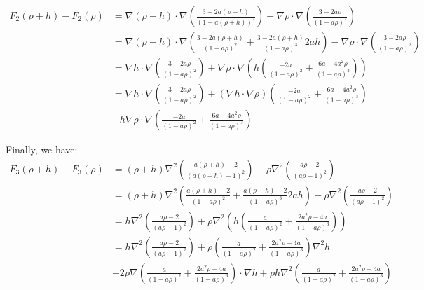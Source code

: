 \documentclass[11pt, a4paper]{article}
\theoremstyle{definition}
\begin{document}
\begin{align*}
	F_2(\rho+h) - F_2(\rho) &= \nabla (\rho +h) \cdot \nabla \left(\frac{3-2a(\rho +h)}{(1-a(\rho+h))^2}\right) -\nabla \rho \cdot \nabla \left(\frac{3-2a\rho}{(1-a\rho)^2}\right) \\
	&= \nabla (\rho +h) \cdot \nabla \left(\frac{3-2a(\rho +h)}{(1-a\rho)^2} + \frac{3-2a(\rho +h)}{(1-a\rho)^3} 2ah \right) -\nabla \rho \cdot \nabla \left(\frac{3-2a\rho}{(1-a\rho)^2}\right)\\
	&=\nabla h \cdot \nabla \left(\frac{3-2a\rho}{(1-a\rho)^2} \right) + \nabla \rho \cdot \nabla \left(h\left(\frac{-2a }{(1-a\rho)^2} + \frac{6a-4a^2  \rho}{(1-a\rho)^3}  \right)\right)\\
	& = \nabla h \cdot \nabla \left( \frac{3-2a\rho}{(1-a\rho)^2} \right) + \left(\nabla h \cdot \nabla \rho \right) \left( \frac{-2a }{(1-a\rho)^2} + \frac{6a-4a^2  \rho}{(1-a\rho)^3}  \right) \\
	&+ h \nabla \rho \cdot \nabla \left(\frac{-2a }{(1-a\rho)^2} + \frac{6a-4a^2  \rho}{(1-a\rho)^3}  \right)
\end{align*}

Finally, we have:
\begin{align*}
	F_3(\rho+h) - F_3(\rho) &= (\rho +h) \nabla^2 \left(\frac{a(\rho +h) -2}{(a(\rho +h) -1)^2}\right) -\rho \nabla^2 \left(\frac{a\rho -2}{(a\rho -1)^2}\right)\\
	&=  (\rho +h) \nabla^2 \left(\frac{a(\rho +h) -2}{(1-a\rho)^2} + \frac{a(\rho +h) -2}{(1-a\rho)^3}2ah \right) -\rho \nabla^2 \left(\frac{a\rho -2}{(a\rho -1)^2}\right)\\
	&= h \nabla^2 \left(\frac{a\rho -2}{(a\rho -1)^2}\right) + \rho \nabla^2  \left(h\left(\frac{a }{(1-a\rho)^2} + \frac{2a^2\rho -4a}{(1-a\rho)^3} \right)\right)\\
	&= h \nabla^2 \left(\frac{a\rho -2}{(a\rho -1)^2}\right) + \rho  \left(\frac{a }{(1-a\rho)^2} + \frac{2a^2\rho -4a}{(1-a\rho)^3} \right)\nabla^2 h \\
	&+ 2 \rho \nabla \left(\frac{a }{(1-a\rho)^2} + \frac{2a^2\rho -4a}{(1-a\rho)^3} \right) \cdot \nabla h + \rho h \nabla^2  \left(\frac{a }{(1-a\rho)^2} + \frac{2a^2\rho -4a}{(1-a\rho)^3} \right)\\
\end{align*}
\end{document}
